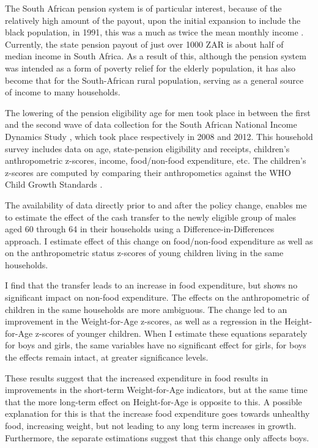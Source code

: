 \documentclass[a4paper,british]{article}\usepackage[]{graphicx}\usepackage[]{color}
\begin{document}
The South African pension system is of particular interest, because
of the relatively high amount of the payout, upon the initial expansion
to include the black population, in 1991, this was a much as twice
the mean monthly income \citep*[see][]{tangwe2013impact}. Currently,
the state pension payout of just over 1000 ZAR is about half of median
income in South Africa. As a result of this, although the pension
system was intended as a form of poverty relief for the elderly population,
it has also become that for the South-African rural population, serving
as a general source of income to many households.

The lowering of the pension eligibility age for men took place in
between the first and the second wave of data collection for the South
African National Income Dynamics Study \citep{saldru2008nids,saldru2012nids,saldru2013nids},
which took place respectively in 2008 and 2012. This household survey
includes data on age, state-pension eligibility and receipts, children's
anthropometric z-scores, income, food/non-food expenditure, etc. The
children's z-scores are computed by comparing their anthropometics
against the WHO Child Growth Standards \citep{who2006child}.

The availability of data directly prior to and after the policy change,
enables me to estimate the effect of the cash transfer to the newly
eligible group of males aged 60 through 64 in their households using
a Difference-in-Differences approach. I estimate effect of this change
on food/non-food expenditure as well as on the anthropometric status
z-scores of young children living in the same households.

I find that the transfer leads to an increase in food expenditure,
but shows no significant impact on non-food expenditure. The effects
on the anthropometric of children in the same households are more
ambiguous. The change led to an improvement in the Weight-for-Age
z-scores, as well as a regression in the Height-for-Age z-scores of
younger children. When I estimate these equations separately for boys
and girls, the same variables have no significant effect for girls,
for boys the effects remain intact, at greater significance levels.

These results suggest that the increased expenditure in food results
in improvements in the short-term Weight-for-Age indicators, but at
the same time that the more long-term effect on Height-for-Age is
opposite to this. A possible explanation for this is that the increase
food expenditure goes towards unhealthy food, increasing weight, but
not leading to any long term increases in growth. Furthermore, the
separate estimations suggest that this change only affects boys.
\end{document}

